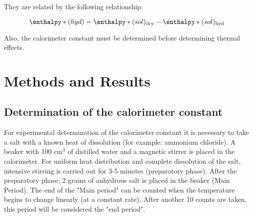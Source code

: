 \documentclass[12pt, letterpaper]{article}
\begin{document}
        They are related by the following relationship:
        
        \begin{equation}
            \enthalpy*(hyd){} = \enthalpy*(sol){}\textsubscript{dry} - \enthalpy*(sol){}\textsubscript{hyd}    
        \end{equation}
        
        Also, the calorimeter constant must be determined before determining thermal effects. 
    \newpage

    \section*{Methods and Results}
        \subsection*{Determination of the calorimeter constant}
            \hspace{4mm} For experimental determination of the calorimeter constant it is necessary to take a salt
            with a known heat of dissolution (for example: ammonium chloride).
            A beaker with 100 cm$^3$ of distilled water and a magnetic stirrer is placed in the calorimeter.
            For uniform heat distribution and complete dissolution of the salt, intensive stirring is carried out for 3-5 minutes (preparatory phase).
            After the preparatory phase, 2 grams of anhydrous salt is placed in the beaker (Main Period).
            The end of the "Main period" can be counted when the temperature begins to change linearly (at a constant rate).
            After another 10 counts are taken, this period will be considered the "end period". \\
     
\end{document}
